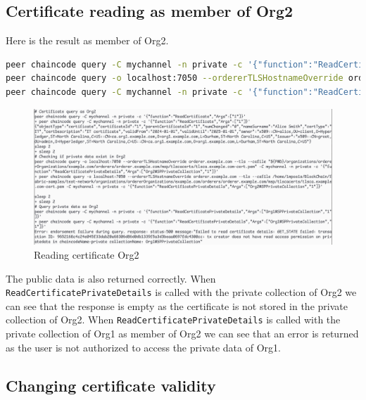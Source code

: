 \documentclass[12pt]{article}
\begin{document}
\subsection{Certificate reading as member of Org2}

Here is the result as member of Org2.

\begin{lstlisting}[language=bash]
peer chaincode query -C mychannel -n private -c '{"function":"ReadCertificate","Args":["1"]}'
peer chaincode query -o localhost:7050 --ordererTLSHostnameOverride orderer.example.com --tls --cafile "${PWD}/organizations/ordererOrganizations/example.com/orderers/orderer.example.com/msp/tlscacerts/tlsca.example.com-cert.pem" -C mychannel -n private -c '{"function":"ReadCertificatePrivateDetails","Args":["Org2MSPPrivateCollection","1"]}'
peer chaincode query -C mychannel -n private -c '{"function":"ReadCertificatePrivateDetails","Args":["Org1MSPPrivateCollection","1"]}'
\end{lstlisting}

\begin{figure}[H]
    \centering
    \includegraphics[width=\textwidth]{imgs/reading_certificate_org2.PNG}
    \caption{Reading certificate Org2}
    \label{fig:readingcertificate}
\end{figure}

The public data is also returned correctly.
When \texttt{ReadCertificatePrivateDetails} is called with the private collection of Org2 we can see that the response is empty as the certificate is not stored in the private collection of Org2.
When \texttt{ReadCertificatePrivateDetails} is called with the private collection of Org1 as member of Org2 we can see that an error is returned as the user is not authorized to access the private data of Org1.

\subsection{Changing certificate validity}
\end{document}
